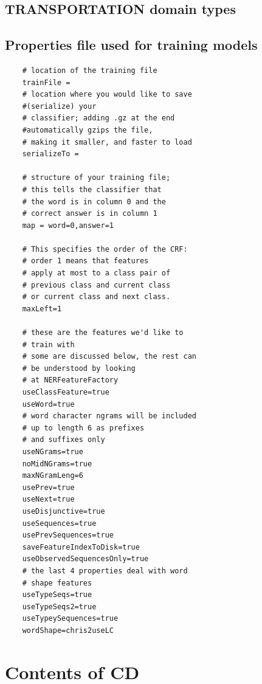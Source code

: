 \documentclass[thesis=M,english]{FITthesis}[2018/05/30]
\begin{document}
\section{TRANSPORTATION domain types}\label{TransportationTypes}

\section{Properties file used for training models}\label{NER Properties file}
\begin{lstlisting}
	# location of the training file
	trainFile = 
	# location where you would like to save 
	#(serialize) your
	# classifier; adding .gz at the end 
	#automatically gzips the file,
	# making it smaller, and faster to load
	serializeTo = 

	# structure of your training file; 
	# this tells the classifier that
	# the word is in column 0 and the
	# correct answer is in column 1
	map = word=0,answer=1

	# This specifies the order of the CRF:
	# order 1 means that features
	# apply at most to a class pair of 
	# previous class and current class
	# or current class and next class.
	maxLeft=1

	# these are the features we'd like to 
	# train with
	# some are discussed below, the rest can 
	# be understood by looking 
	# at NERFeatureFactory
	useClassFeature=true
	useWord=true
	# word character ngrams will be included 
	# up to length 6 as prefixes
	# and suffixes only 
	useNGrams=true
	noMidNGrams=true
	maxNGramLeng=6
	usePrev=true
	useNext=true
	useDisjunctive=true
	useSequences=true
	usePrevSequences=true
	saveFeatureIndexToDisk=true
	useObservedSequencesOnly=true
	# the last 4 properties deal with word 
	# shape features
	useTypeSeqs=true
	useTypeSeqs2=true
	useTypeySequences=true
	wordShape=chris2useLC
\end{lstlisting}
\chapter{Contents of CD}\label{app:CDcontent}

\end{document}

